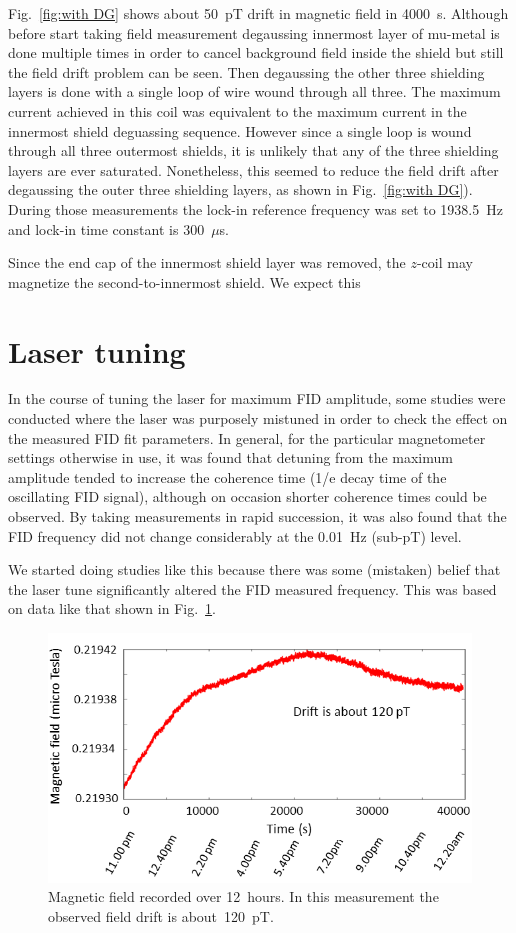 Fig.~\ref{fig:with DG} shows about 50~pT drift in magnetic field in
4000~s. Although before start taking field measurement degaussing
innermost layer of mu-metal is done multiple times in order to cancel
background field inside the shield but still the field drift problem
can be seen. Then degaussing the other three shielding layers is done
with a single loop of wire wound through all three.  The maximum
current achieved in this coil was equivalent to the maximum current in
the innermost shield deguassing sequence.  However since a single loop
is wound through all three outermost shields, it is unlikely that any
of the three shielding layers are ever saturated.  Nonetheless, this
seemed to reduce the field drift after degaussing the outer three
shielding layers, as shown in Fig.~\ref{fig:with DG}). During those
measurements the lock-in reference frequency was set to 1938.5~Hz and
lock-in time constant is 300~$\mu$s.

Since the end cap of the innermost shield layer was removed, the
$z$-coil may magnetize the second-to-innermost shield.  We expect this 

\section{Laser tuning} 

In the course of tuning the laser for maximum FID amplitude, some
studies were conducted where the laser was purposely mistuned in order
to check the effect on the measured FID fit parameters.  In general,
for the particular magnetometer settings otherwise in use, it was
found that detuning from the maximum amplitude tended to increase the
coherence time (1/e decay time of the oscillating FID signal),
although on occasion shorter coherence times could be observed.  By
taking measurements in rapid succession, it was also found that the
FID frequency did not change considerably at the 0.01~Hz (sub-pT)
level.

We started doing studies like this because there was some (mistaken)
belief that the laser tune significantly altered the FID measured
frequency.  This was based on data like that shown in
Fig.~\ref{fig:digilock-drift}.

\begin{figure}%
  \centering\includegraphics[width=0.6\linewidth]{figures/field-drift}
  \caption{Magnetic field recorded over 12~hours.  In this
    measurement the observed field drift is
    about~120~pT.\label{fig:digilock-drift}}
\end{figure}

